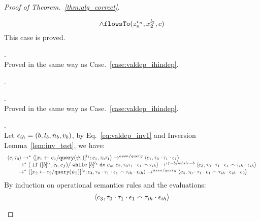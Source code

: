 \begin{proof}[Proof of Theorem.~\ref{thm:alg_correct}]
\begin{case}
\begin{subcase}
\begin{subsubcase}
\begin{subsubsubcase}
\[\land \mathtt{flowsTo}(z_n^{r_n}, {x}_2^{l_2}, c)
\]
%
This case is proved.
\end{subsubsubcase}
\begin{subsubsubcase}.
\\
Proved in the same way as Case.~\ref{case:valdep_ihindep}.
\end{subsubsubcase}
\end{subsubcase}
\begin{subsubcase}.
\begin{subsubsubcase}.
\\
Proved in the same way as Case.~\ref{case:valdep_ihindep}.
\end{subsubsubcase}
\begin{subsubsubcase}.
\\
Let $\mathtt{\epsilon}_{ih} = (b, l_b, n_b, v_b)$, by Eq.~\ref{eq:valdep_inv1} and {Inversion Lemma~\ref{lem:inv_test}}, we have:
\begin{equation}
\label{eq:m1test_inv1}
  \begin{array}{l}   
\langle {c}, \mathtt{\tau}_0 \rangle \rightarrow^{*} 
\langle [\mathrel{ {x}_1 \leftarrow e_1 / {\tt query}(\psi_1) }]^{l_1} ; {c}_1, \mathtt{\tau}_0 \mathtt{\tau}_1 \rangle  
\rightarrow^{assn/query}
 \langle c_1, \mathtt{\tau}_0 \cdot \mathtt{\tau}_1 \cdot \mathtt{\epsilon}_1 \rangle 
 \\
  \qquad \rightarrow^{*} 
  \langle \;\mathtt{if}\; ([b]^{l_b}, c_t, c_f) / \;\mathtt{while}\; [b]^{l_b} \;\mathtt{do}\; c_w;{c}_2, 
  \mathtt{\tau}_0 \mathtt{\tau}_1 \cdot \mathtt{\epsilon}_1 \smallfrown \mathtt{\tau}_{ih} \rangle 
 \rightarrow^{if-b / while-b} 
  \langle c_3, 
  \mathtt{\tau}_0 \cdot \mathtt{\tau}_1 \cdot \mathtt{\epsilon}_1 \smallfrown \mathtt{\tau}_{ih} \cdot \mathtt{\epsilon}_{ih} \rangle 
  \\
  \qquad   \rightarrow^{*} 
  \langle [\mathrel{ {x}_2 \leftarrow e_2 / {\tt query}(\psi_2) }]^{l_2};{c}_4, 
  \mathtt{\tau}_0 \cdot \mathtt{\tau}_1 \cdot \mathtt{\epsilon}_1 \smallfrown \mathtt{\tau}_{ih} \cdot \mathtt{\epsilon}_{ih} \rangle 
  \rightarrow^{assn/query} 
  \langle {c}_4,  \mathtt{\tau}_0 \cdot \mathtt{\tau}_1 \cdot \mathtt{\epsilon}_1  \smallfrown \mathtt{\tau}_{ih} \cdot \mathtt{\epsilon}_{ih} \cdot \mathtt{\epsilon}_2 \rangle 
\end{array}
\end{equation}
 By induction on operational semantics rules and the evaluations: 
 \[
 \langle c_3, 
  \mathtt{\tau}_0 \cdot \mathtt{\tau}_1 \cdot \mathtt{\epsilon}_1 \smallfrown \mathtt{\tau}_{ih} \cdot \mathtt{\epsilon}_{ih} \rangle 
\]
\end{subsubsubcase}
\end{subsubcase}
\end{subcase}
\end{case}
\end{proof}
